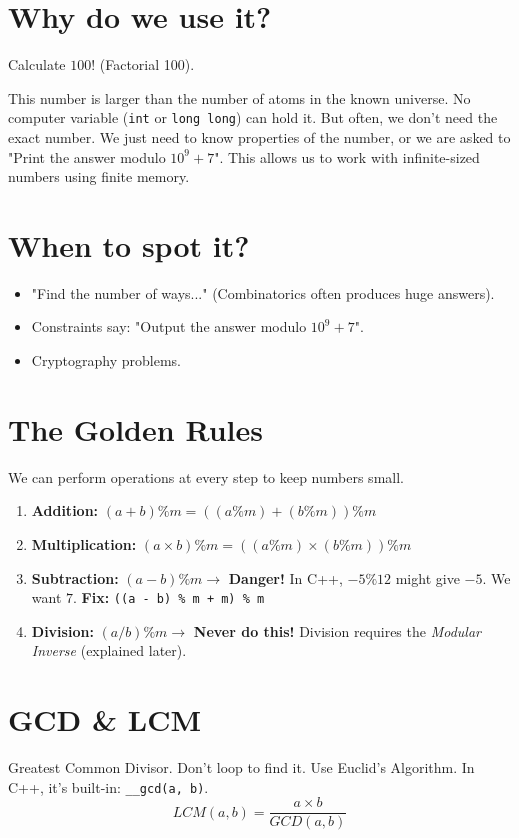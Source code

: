 \documentclass[12pt, a4paper]{report}
\begin{document}
\section{Why do we use it?}
\begin{thinkbox}
Calculate $100!$ (Factorial 100).
\end{thinkbox}
This number is larger than the number of atoms in the known universe. No computer variable (\texttt{int} or \texttt{long long}) can hold it.
But often, we don't need the exact number. We just need to know properties of the number, or we are asked to "Print the answer modulo $10^9+7$".
This allows us to work with infinite-sized numbers using finite memory.

\section{When to spot it?}
\begin{itemize}
    \item "Find the number of ways..." (Combinatorics often produces huge answers).
    \item Constraints say: "Output the answer modulo $10^9+7$".
    \item Cryptography problems.
\end{itemize}

\section{The Golden Rules}
We can perform operations at every step to keep numbers small.
\begin{enumerate}
    \item \textbf{Addition:} $(a + b) \% m = ((a \% m) + (b \% m)) \% m$
    \item \textbf{Multiplication:} $(a \times b) \% m = ((a \% m) \times (b \% m)) \% m$
    \item \textbf{Subtraction:} $(a - b) \% m \rightarrow$ \textbf{Danger!} In C++, $-5 \% 12$ might give $-5$. We want $7$.
    \textbf{Fix:} \texttt{((a - b) \% m + m) \% m}
    \item \textbf{Division:} $(a / b) \% m \rightarrow$ \textbf{Never do this!} Division requires the \textit{Modular Inverse} (explained later).
\end{enumerate}

\section{GCD \& LCM}
Greatest Common Divisor. Don't loop to find it. Use Euclid's Algorithm.
In C++, it's built-in: \texttt{\_\_gcd(a, b)}.
\[ LCM(a, b) = \frac{a \times b}{GCD(a, b)} \]
\end{document}
